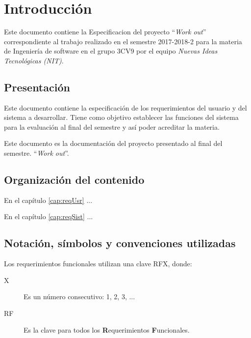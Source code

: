 \chapter{Introducción}


	Este documento contiene la Especificacion del proyecto ``{\em Work out}'' correspondiente al trabajo realizado en el semestre 2017-2018-2 para la materia de Ingeniería de software en el grupo 3CV9 por el equipo {\em Nuevas Ideas Tecnológicas (NIT)}.

\section{Presentación}


	Este documento contiene la especificación de los requerimientos del usuario y del sistema a desarrollar. Tiene como objetivo establecer las funciones del sistema para la evaluación al final del semestre y así poder acreditar la materia. 
	
	Este documento es la documentación del proyecto presentado al final del semestre. ``{\em Work out}''.
	
\section{Organización del contenido}

	En el capítulo \ref{cap:reqUsr} ...
	
	En el capítulo \ref{cap:reqSist} ...

\section{Notación, símbolos y convenciones utilizadas}

	Los requerimientos funcionales utilizan una clave RFX, donde:
	
\begin{description}
	\item[X] Es un número consecutivo: 1, 2, 3, ...
	\item[RF] Es la clave para todos los {\bf R}equerimientos {\bf F}uncionales.
\end{description}

